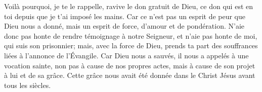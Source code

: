 Voilà pourquoi, je te le rappelle, ravive le don gratuit de Dieu,
	ce don qui est en toi depuis que je t’ai imposé les mains.
Car ce n’est pas un esprit de peur que Dieu nous a donné,
	mais un esprit de force, d’amour et de pondération.
N’aie donc pas honte de rendre témoignage à notre Seigneur,
	et n’aie pas honte de moi, qui suis son prisonnier;
	mais, avec la force de Dieu,
	prends ta part des souffrances liées à l’annonce de l’Évangile.
Car Dieu nous a sauvés, il nous a appelés à une vocation sainte,
	non pas à cause de nos propres actes, mais à cause de son projet à lui et de sa grâce.
Cette grâce nous avait été donnée dans le Christ Jésus avant tous les siècles.
